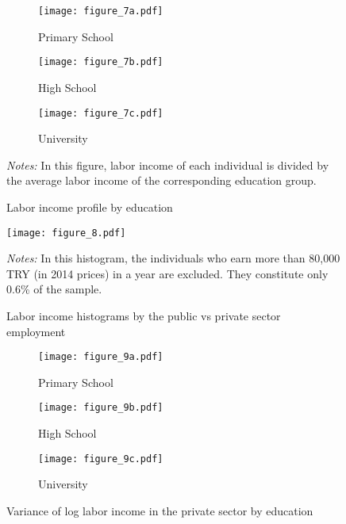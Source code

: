 \documentclass[12pt,author-year]{article}
\begin{document}
\begin{figure}[H]
	\label{figure7}
	\centering
	\begin{subfigure}[b]{0.32\textwidth}
		\texttt{[image: figure\_7a.pdf]}
		\caption{Primary School}
	\end{subfigure}
	\begin{subfigure}[b]{0.32\textwidth}
		\texttt{[image: figure\_7b.pdf]}
		\caption{High School}
	\end{subfigure}    
	\begin{subfigure}[b]{0.32\textwidth}
		\texttt{[image: figure\_7c.pdf]}
		\caption{University}
	\end{subfigure}  
	\caption{Labor income profile by education}
	\medskip
	\begin{minipage}{0.75\textwidth} %
		{\footnotesize \textit{Notes:} In this figure, labor income of each individual is divided by the average labor income of the corresponding education group. \par}
	\end{minipage}
\end{figure}

\begin{figure}[H]
	\label{figure8}
	\centering
	\texttt{[image: figure\_8.pdf]}
	\caption{Labor income histograms by the public vs private sector employment}
	\medskip
	\begin{minipage}{0.75\textwidth} %
		{\footnotesize \textit{Notes:} In this histogram, the individuals who earn more than 80,000 TRY (in 2014 prices) in a year are excluded. They constitute only 0.6\% of the sample. \par}
	\end{minipage}
\end{figure}

\begin{figure}[H]
	\label{figure9}
	\centering
	\begin{subfigure}[b]{0.32\textwidth}
		\texttt{[image: figure\_9a.pdf]}
		\caption{Primary School}
	\end{subfigure}
	\begin{subfigure}[b]{0.32\textwidth}
		\texttt{[image: figure\_9b.pdf]}
		\caption{High School}
	\end{subfigure}    
	\begin{subfigure}[b]{0.32\textwidth}
		\texttt{[image: figure\_9c.pdf]}
		\caption{University}
	\end{subfigure}  
	\caption{Variance of log labor income in the private sector by education}
\end{figure}
\end{document}

